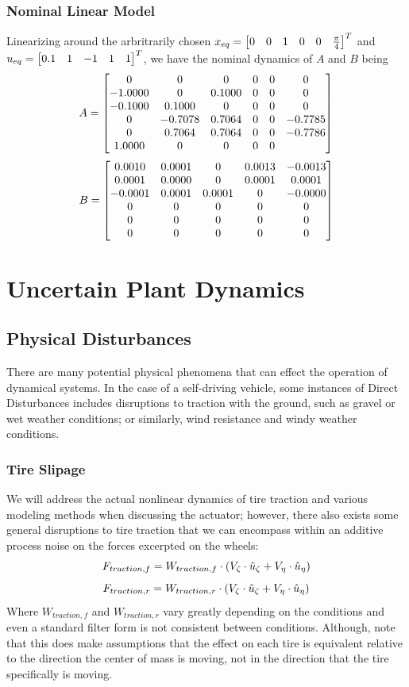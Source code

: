 \documentclass[conference, onecolumn]{IEEEtran}
\begin{document}
\subsubsection{Nominal Linear Model}
Linearizing around the arbritrarily chosen $x_{eq} = \mqty[0&0&1&0&0&\frac{\pi}{4}]^T$ and $u_{eq} = \mqty[0.1&1&-1&1&1]^T$, we have the nominal dynamics of $A$ and $B$ being \[
    A = \mqty[
        0       & 0       & 0      & 0 & 0 & 0       \\
        -1.0000 & 0       & 0.1000 & 0 & 0 & 0       \\
        -0.1000 & 0.1000  & 0      & 0 & 0 & 0       \\
        0       & -0.7078 & 0.7064 & 0 & 0 & -0.7785 \\
        0       & 0.7064  & 0.7064 & 0 & 0 & -0.7786 \\
        1.0000  & 0       & 0      & 0 & 0 & 
    ]
\]\[
    B = \mqty[
        0.0010  & 0.0001 & 0      & 0.0013 & -0.0013 \\
        0.0001  & 0.0000 & 0      & 0.0001 & 0.0001  \\
        -0.0001 & 0.0001 & 0.0001 & 0      & -0.0000 \\
        0       & 0      & 0      & 0      & 0       \\
        0       & 0      & 0      & 0      & 0       \\
        0       & 0      & 0      & 0      & 0
    ]
\]

\section{Uncertain Plant Dynamics}
\subsection{Physical Disturbances}
There are many potential physical phenomena that can effect the operation of dynamical systems. 
In the case of a self-driving vehicle, some instances of Direct Disturbances includes disruptions to traction with the ground, such as gravel or wet weather conditions; or similarly, wind resistance and windy weather conditions.

\subsubsection{Tire Slipage}
We will address the actual nonlinear dynamics of tire traction and various modeling methods when discussing the actuator; however, there also exists some general disruptions to tire traction that we can encompass within an additive process noise on the forces excerpted on the wheels:\[
    F_{traction,f} = W_{traction, f} \cdot \qty(V_\zeta \cdot \hat{u}_{\zeta} + V_\eta \cdot \hat{u}_\eta)
\]\[
    F_{traction,r} = W_{traction, r} \cdot \qty(V_\zeta \cdot \hat{u}_{\zeta} + V_\eta \cdot \hat{u}_\eta)
\] Where $W_{traction, f}$ and $W_{traction,r}$ vary greatly depending on the conditions and even a standard filter form is not consistent between conditions.
Although, note that this does make assumptions that the effect on each tire is equivalent relative to the direction the center of mass is moving, not in the direction that the tire specifically is moving.
\end{document}
